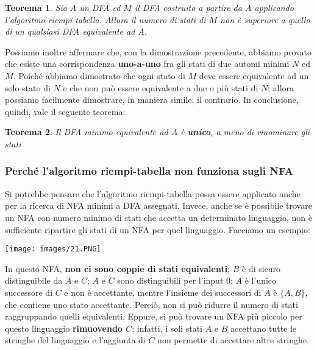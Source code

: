 \documentclass[12pt]{article}
\newtheorem{Teorema}{Teorema}[subsection]
\begin{document}
\begin{Teorema}
    Sia $A$ un DFA ed $M$ il DFA costruito a partire da $A$ applicando l'algoritmo riempi-tabella. Allora il numero di stati di $M$ non è superiore a quello di un qualsiasi DFA equivalente ad $A$.
\end{Teorema}
Possiamo inoltre affermare che, con la dimostrazione precedente, abbiamo provato che esiste una corrispondenza \textbf{uno-a-uno} fra gli stati di due automi minimi $N$ ed $M$. Poiché abbiamo dimostrato che ogni stato di $M$ deve essere equivalente ad un solo stato di $N$ e che non può essere equivalente a due o più stati di $N$; allora possiamo facilmente dimostrare, in maniera simile, il contrario. In conclusione, quindi, vale il seguente teorema:
\begin{Teorema}
    Il DFA minimo equivalente ad $A$ è \textbf{unico}, a meno di rinominare gli stati
\end{Teorema}
\subsubsection{Perché l'algoritmo riempi-tabella non funziona sugli NFA}
Si potrebbe pensare che l'algoritmo riempi-tabella possa essere applicato anche per la ricerca di NFA minimi a DFA assegnati. Invece, anche se è possibile trovare un NFA con numero minimo di stati che accetta un determinato linguaggio, non è sufficiente ripartire gli stati di un NFA per quel linguaggio. Facciamo un esempio:
\begin{center}
    \texttt{[image: images/21.PNG]}
\end{center}
In questo NFA, \textbf{non ci sono coppie di stati equivalenti}; $B$ è di sicuro distinguibile da $A$ e $C$; $A$ e $C$ sono distinguibili per l'input $0$; $A$ è l'unico successore di $C$ e non è accettante, mentre l'insieme dei successori di $A$ è $\{A, B\}$, che contiene uno stato accettante. Perciò, non si può ridurre il numero di stati raggruppando quelli equivalenti. Eppure, si può trovare un NFA più piccolo per questo linguaggio \textbf{rimuovendo $C$}; infatti, i soli stati $A$ e $B$ accettano tutte le stringhe del linguaggio e l'aggiunta di $C$ non permette di accettare altre stringhe.
\end{document}
